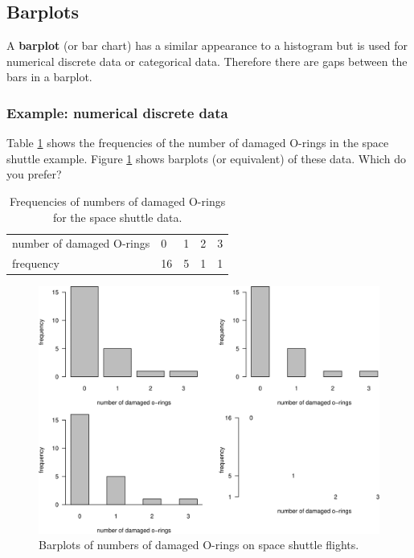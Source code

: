 \documentclass[
  british,
]{book}
\begin{document}
\hypertarget{barplots}{%
\subsection{Barplots}\label{barplots}}

A \textbf{barplot} (or bar chart) has a similar appearance to a histogram but is used for numerical discrete data or categorical data. Therefore there are gaps between the bars in a barplot.

\hypertarget{example-numerical-discrete-data}{%
\subsubsection*{Example: numerical discrete data}\label{example-numerical-discrete-data}}

Table \ref{tab:shuttlenew} shows the frequencies of the number of damaged O-rings in the space shuttle example. Figure \ref{fig:shuttlebarplots} shows barplots (or equivalent) of these data. Which do you prefer?

\begin{table}

\caption{\label{tab:shuttlenew}Frequencies of numbers of damaged O-rings for the space shuttle data.}
\centering
\begin{tabular}[t]{lllll}
\toprule
number of damaged O-rings & 0 & 1 & 2 & 3\\
frequency & 16 & 5 & 1 & 1\\
\bottomrule
\end{tabular}
\end{table}

\FloatBarrier

\begin{figure}

{\centering \includegraphics[width=0.8\linewidth]{images/shuttle_barplots} 

}

\caption{Barplots of numbers of damaged O-rings on space shuttle flights.}\label{fig:shuttlebarplots}
\end{figure}
\FloatBarrier
\end{document}

